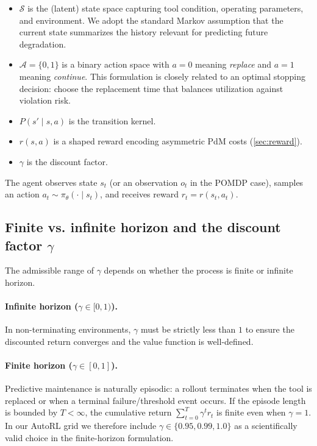 \documentclass[11pt]{article}
\begin{document}
\begin{itemize}
\item $\mathcal{S}$ is the (latent) state space capturing tool condition, operating parameters, and environment. We adopt the standard Markov assumption that the current state summarizes the history relevant for predicting future degradation.
\item $\mathcal{A}=\{0,1\}$ is a binary action space with $a=0$ meaning \emph{replace} and $a=1$ meaning \emph{continue}. This formulation is closely related to an optimal stopping decision: choose the replacement time that balances utilization against violation risk.
\item $P(s'\mid s,a)$ is the transition kernel.
\item $r(s,a)$ is a shaped reward encoding asymmetric PdM costs (\cref{sec:reward}).
\item $\gamma$ is the discount factor.
\end{itemize}

The agent observes state $s_t$ (or an observation $o_t$ in the POMDP case), samples an action $a_t\sim\pi_\theta(\cdot\mid s_t)$, and receives reward $r_t=r(s_t,a_t)$.

\subsection{Finite vs. infinite horizon and the discount factor $\gamma$}
\label{sec:gamma}
The admissible range of $\gamma$ depends on whether the process is finite or infinite horizon.

\paragraph{Infinite horizon ($\gamma\in[0,1)$).}
In non-terminating environments, $\gamma$ must be strictly less than $1$ to ensure the discounted return converges and the value function is well-defined.

\paragraph{Finite horizon ($\gamma\in[0,1]$).}
Predictive maintenance is naturally episodic: a rollout terminates when the tool is replaced or when a terminal failure/threshold event occurs. If the episode length is bounded by $T<\infty$, the cumulative return $\sum_{t=0}^{T}\gamma^t r_t$ is finite even when $\gamma=1$. In our AutoRL grid we therefore include $\gamma\in\{0.95,0.99,1.0\}$ as a scientifically valid choice in the finite-horizon formulation.
\end{document}
